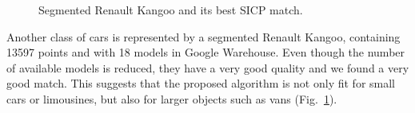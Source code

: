 \documentclass{llncs}
\begin{document}
  \begin{figure}
    \centering
    \hspace{3 mm}
    \hspace{3 mm}
    \caption{Segmented Renault Kangoo and its best SICP match.}
    \label{renault_trio}
  \end{figure}

Another class of cars is represented by a segmented Renault Kangoo,
containing 13597 points and with 18 models in Google Warehouse. Even
though the number of available models is reduced, they have a very
good quality and we found a very good match. This suggests that the
proposed algorithm is not only fit for small cars or limousines, but
also for larger objects such as vans (Fig.~\ref{renault_trio}).
\end{document}
